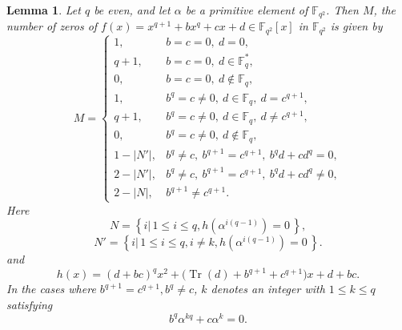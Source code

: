\documentclass[12pt]{amsart}
\newtheorem{lemma}[theorem]{Lemma}
\theoremstyle{definition}
\theoremstyle{remark}
\numberwithin{equation}{section}
\begin{document}
\begin{lemma}\label{l7}
Let $q$ be even, and let $\alpha$ be a primitive element of
$\mathbb{F}_{q^2}$. Then $M$, the number of zeros of
$f(x)=x^{q+1}+bx^q+cx+d\in\mathbb{F}_{q^2}[x]$
in $\mathbb{F}_{q^2}$ is given by
\[
M=
\begin{cases}
1, & b=c=0,\ d=0,\\[2mm]
q+1, & b=c=0,\ d\in\mathbb{F}_q^*,\\[2mm]
0, & b=c=0,\ d\notin\mathbb{F}_q,\\[2mm]
1, & b^q=c\neq0,\ d\in\mathbb{F}_q,\ d=c^{q+1},\\[2mm]
q+1, & b^q=c\neq0,\ d\in\mathbb{F}_q,\ d\neq c^{q+1},\\[2mm]
0, & b^q=c\neq0,\ d\notin\mathbb{F}_q,\\[2mm]
1-|N'|, & b^q\neq c,\ b^{q+1}=c^{q+1},\
b^qd+cd^q=0,\\[2mm]
2-|N'|, & b^q\neq c,\ b^{q+1}=c^{q+1},\
b^qd+cd^q\neq0,\\[2mm]
2-|N|, & b^{q+1}\neq c^{q+1}.
\end{cases}
\]
Here
\[
N=\left\{i|\,1\leq i\leq q,
h\left(\alpha^{i(q-1)}\right)=0\,\right\},
\]
\[
N'=\left\{i|\,1\leq i\leq q,i\neq k,h\left(\alpha^{i(q-1)}\right)=0\,\right\}.
\]
and
\[
h(x)=(d+bc)^q x^2+
\bigl(\operatorname{Tr}(d)+b^{q+1}+c^{q+1}\bigr)x+d+bc.
\]
In the cases where $b^{q+1}=c^{q+1}, b^q\neq c$, $k$ denotes an integer
with $1\leq k\leq q$ satisfying
\[
b^q\alpha^{kq}+c\alpha^k=0.
\]
\end{lemma}
\end{document}
